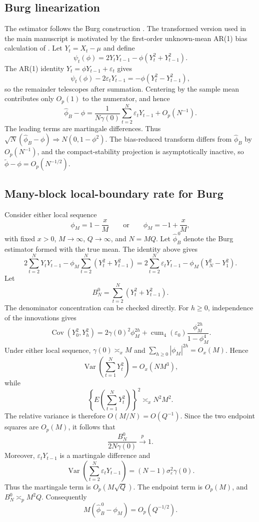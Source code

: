 \documentclass[12pt]{article}
\theoremstyle{remark}
\begin{document}
\subsection{Burg linearization}
The estimator follows the Burg construction \citep{Burg:1968}. The transformed
version used in the main manuscript is motivated by the first-order unknown-mean
AR(1) bias calculation of \citet{Zhang.McLeod:2006}. Let $Y_t=X_t-\mu$ and define
\[
\psi_t(\phi)=2Y_tY_{t-1}-\phi(Y_t^2+Y_{t-1}^2).
\]
The AR(1) identity $Y_t=\phi Y_{t-1}+\varepsilon_t$ gives
\[
\psi_t(\phi)-2\varepsilon_tY_{t-1}=-\phi(Y_t^2-Y_{t-1}^2),
\]
so the remainder telescopes after summation. Centering by the sample mean contributes only $O_p(1)$ to the numerator, and hence
\begin{equation}
\widehat\phi_B-\phi
=\frac1{N\gamma(0)}\sum_{t=2}^N\varepsilon_tY_{t-1}+O_p(N^{-1}).
\label{eq:supp-burg-linearization}
\end{equation}
The leading terms are martingale differences. Thus $\sqrt N(\widehat\phi_B-\phi)\Rightarrow N(0,1-\phi^2)$. The bias-reduced transform differs from $\widehat\phi_B$ by $O_p(N^{-1})$, and the compact-stability projection is asymptotically inactive, so $\widetilde\phi-\phi=O_p(N^{-1/2})$.

\subsection{Many-block local-boundary rate for Burg}
Consider either local sequence
\[
\phi_M=1-\frac{x}{M}
\qquad\text{or}\qquad
\phi_M=-1+\frac{x}{M},
\]
with fixed $x>0$, $M\to\infty$, $Q\to\infty$, and $N=MQ$.
Let $\widehat\phi_B^{\,0}$ denote the Burg estimator formed with the true
mean. The identity above gives
\[
2\sum_{t=2}^NY_tY_{t-1}
-\phi_M\sum_{t=2}^N(Y_t^2+Y_{t-1}^2)
=
2\sum_{t=2}^N\varepsilon_tY_{t-1}
-\phi_M(Y_N^2-Y_1^2).
\]
Let
\[
B_N^0=\sum_{t=2}^N(Y_t^2+Y_{t-1}^2).
\]
The denominator concentration can be checked directly. For $h\ge0$,
independence of the innovations gives
\[
\operatorname{Cov}(Y_0^2,Y_h^2)
=
2\gamma(0)^2\phi_M^{2h}
+
\operatorname{cum}_4(\varepsilon_0)
\frac{\phi_M^{2h}}{1-\phi_M^4}.
\]
Under either local sequence, $\gamma(0)\asymp_x M$ and
$\sum_{h\ge0}|\phi_M|^{2h}=O_x(M)$. Hence
\[
\operatorname{Var}\left(\sum_{t=1}^NY_t^2\right)=O_x(NM^3),
\]
while
\[
\left\{E\left(\sum_{t=1}^NY_t^2\right)\right\}^2
\asymp_x N^2M^2.
\]
The relative variance is therefore $O(M/N)=O(Q^{-1})$. Since the two endpoint squares are $O_p(M)$, it follows that
\[
\frac{B_N^0}{2N\gamma(0)}\xrightarrow{p}1.
\]
Moreover, $\varepsilon_tY_{t-1}$ is a martingale difference and
\[
\operatorname{Var}\left(\sum_{t=2}^N\varepsilon_tY_{t-1}\right)
=
(N-1)\sigma_\varepsilon^2\gamma(0).
\]
Thus the martingale term is $O_p(M\sqrt Q)$. The endpoint term is
$O_p(M)$, and $B_N^0\asymp_p M^2Q$. Consequently
\[
M(\widehat\phi_B^{\,0}-\phi_M)=O_p(Q^{-1/2}).
\]
\end{document}
